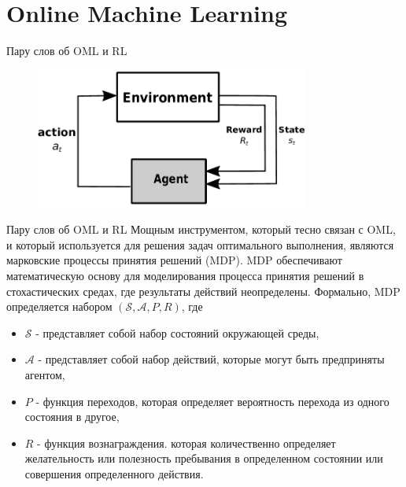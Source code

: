 \documentclass[aspectratio=169]{beamer}
\begin{document}
    \section{Online Machine Learning}

        \begin{frame}{Пару слов об OML и RL}
            \begin{figure}
                \includegraphics[width=0.8\textwidth]{Reinforcement-Learning-Agent-and-Environment}
            \end{figure}
        \end{frame}

        \begin{frame}{Пару слов об OML и RL}
            Мощным инструментом, который тесно связан с OML, и который используется для решения задач оптимального выполнения, являются марковские процессы принятия решений (MDP). MDP обеспечивают математическую основу для моделирования процесса принятия решений в стохастических средах, где результаты действий неопределены.
            Формально, MDP определяется набором $(\mathcal S, \mathcal A, P, R)$, где
        
            \begin{itemize}
        
                \item $\mathcal S$ - представляет собой набор состояний окружающей среды,
                
                \item $\mathcal A$ - представляет собой набор действий, которые могут быть предприняты агентом,
        
                \item $P$ - функция переходов, которая определяет вероятность перехода из одного состояния в другое,
        
                \item $R$ - функция вознаграждения. которая количественно определяет желательность или полезность пребывания в определенном состоянии или совершения определенного действия.
            \end{itemize}
        
        \end{frame}
\end{document}
